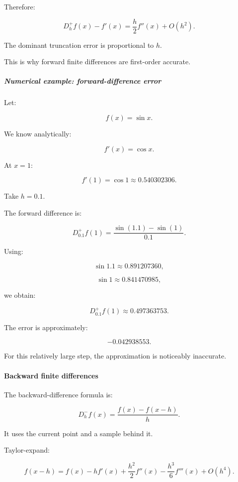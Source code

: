 Therefore:

\[
\boxed{ D_h^+f(x)-f'(x) = \frac h2f''(x)+O(h^2) }.
\]

The dominant truncation error is proportional to \(h\).

This is why forward finite differences are first-order accurate.

\subparagraph{Numerical example: forward-difference error}\label{02-foundations-ii-ch025-numerical-example-forward-difference-error}

\hypertarget{02-foundations-ii-ch025-numerical-example-forward-difference-error}{}

Let:

\[
f(x)=\sin x.
\]

We know analytically:

\[
f'(x)=\cos x.
\]

At \(x=1\):

\[
f'(1)=\cos1\approx0.540302306.
\]

Take \(h=0.1\).

The forward difference is:

\[
D_{0.1}^+f(1)= \frac{\sin(1.1)-\sin(1)}{0.1}.
\]

Using:

\[
\sin1.1\approx0.891207360,
\]

\[
\sin1\approx0.841470985,
\]

we obtain:

\[
\boxed{ D_{0.1}^+f(1)\approx0.497363753 }.
\]

The error is approximately:

\[
-0.042938553.
\]

For this relatively large step, the approximation is noticeably inaccurate.

\paragraph{Backward finite differences}\label{02-foundations-ii-ch025-backward-finite-differences}

\hypertarget{02-foundations-ii-ch025-backward-finite-differences}{}

The backward-difference formula is:

\[
\boxed{ D_h^-f(x)= \frac{f(x)-f(x-h)}h }.
\]

It uses the current point and a sample behind it.

Taylor-expand:

\[
f(x-h) = f(x)-hf'(x)+ \frac{h^2}{2}f''(x)- \frac{h^3}{6}f'''(x)+O(h^4).
\]

